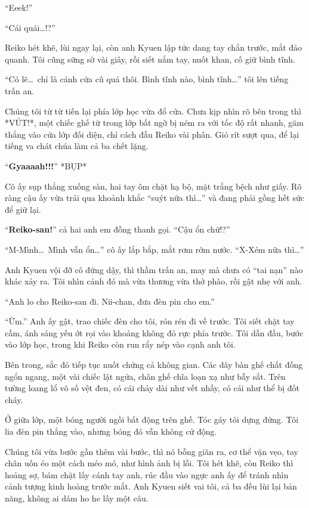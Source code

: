 \documentclass[../main.tex]{subfiles}
\begin{document}
``Eeek!''

``Cái quái\dots!?''

Reiko hét khẽ, lùi ngay lại, còn anh Kyuen lập tức dang tay chắn trước, mắt đảo quanh. Tôi cũng sững sờ vài giây, rồi siết nắm tay, nuốt khan, cố giữ bình tĩnh.

``Có lẽ\dots\ chỉ là cánh cửa cũ quá thôi. Bình tĩnh nào, bình tĩnh\dots'' tôi lên tiếng trấn an.

Chúng tôi từ từ tiến lại phía lớp học vừa đổ cửa. Chưa kịp nhìn rõ bên trong thì *VÚT!*, một chiếc ghế từ trong lớp bất ngờ bị ném ra với tốc độ rất nhanh, găm thẳng vào cửa lớp đối diện, chỉ cách đầu Reiko vài phân. Gió rít sượt qua, để lại tiếng va chát chúa làm cả ba chết lặng.

``\textbf{Gyaaaah!!!}'' *BỤP*

Cô ấy sụp thẳng xuống sàn, hai tay ôm chặt hạ bộ, mặt trắng bệch như giấy. Rõ ràng cậu ấy vừa trải qua khoảnh khắc ``suýt nữa thì\dots'' và đang phải gồng hết sức để giữ lại.

``\textbf{Reiko-san!}'' cả hai anh em đồng thanh gọi. ``Cậu ổn chứ!?''

``M-Mình\dots\ Mình vẫn ổn\dots'' cô ấy lắp bắp, mắt rơm rớm nước. ``X-Xém nữa thì\dots''

Anh Kyuen vội đỡ cô đứng dậy, thì thầm trấn an, may mà chưa có ``tai nạn'' nào khác xảy ra. Tôi nhìn cảnh đó mà vừa thương vừa thở phào, rồi gật nhẹ với anh.

``Anh lo cho Reiko-san đi. Nii-chan, đưa đèn pin cho em.''

``Ừm.'' Anh ấy gật, trao chiếc đèn cho tôi, rón rén đi về trước. Tôi siết chặt tay cầm, ánh sáng yếu ớt rọi vào khoảng không đỏ rực phía trước. Tôi dẫn đầu, bước vào lớp học, trong khi Reiko còn run rẩy nép vào cạnh anh tôi.

Bên trong, sắc đỏ tiếp tục nuốt chửng cả không gian. Các dãy bàn ghế chất đống ngổn ngang, một vài chiếc lật ngửa, chân ghế chĩa loạn xạ như bẫy sắt. Trên tường loang lổ vô số vệt đen, có cái chảy dài như vết nhầy, có cái như thể bị đốt cháy.

Ở giữa lớp, một bóng người ngồi bất động trên ghế. Tóc gáy tôi dựng đứng. Tôi lia đèn pin thẳng vào, nhưng bóng đó vẫn không cử động.

Chúng tôi vừa bước gần thêm vài bước, thì nó bỗng giãn ra, cơ thể vặn vẹo, tay chân uốn éo một cách méo mó, như hình ảnh bị lỗi. Tôi hét khẽ, còn Reiko thì hoảng sợ, bám chặt lấy cánh tay anh, rúc đầu vào ngực anh ấy để tránh nhìn cảnh tượng kinh hoàng trước mắt. Anh Kyuen siết vai tôi, cả ba đều lùi lại bản năng, không ai dám ho he lấy một câu.
\end{document}
